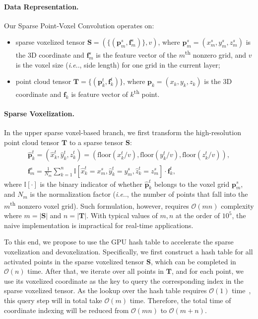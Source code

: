 \documentclass[runningheads]{llncs}
\makeatletter
\DeclareRobustCommand\onedot{\futurelet\@let@token\@onedot}
\def\@onedot{\ifx\@let@token.\else.\null\fi\xspace}
\def\ie{\emph{i.e}\onedot} \def\Ie{\emph{I.e}\onedot}
\def\module{Sparse Point-Voxel Convolution\xspace}
\makeatother
\begin{document}
\paragraph{Data Representation.}

Our \module operates on:
\begin{itemize}
     \item sparse voxelized tensor $\bm{S}= (\{(\bm{p}^s_m, \bm{f}^s_m)\}, v)$, where $\bm{p}^s_m = (x^s_m, y^s_m, z^s_m)$ is the 3D coordinate and $\bm{f}^s_m$ is the feature vector of the $m$\textsuperscript{th} nonzero grid, and $v$ is the voxel size (\ie, side length) for one grid in the current layer;
     \item point cloud tensor $\bm{T}= \{(\bm{p}^t_k, \bm{f}^t_k)\}$, where $\bm{p}_k = (x_k, y_k, z_k)$ is the 3D coordinate and $\bm{f}_k$ is feature vector of $k$\textsuperscript{th} point.
\end{itemize}

\paragraph{Sparse Voxelization.}

In the upper sparse voxel-based branch, we first transform the high-resolution point cloud tensor $\bm{T}$ to a sparse tensor $\bm{S}$:
\begin{align}
  \hat{\bm{p}}^t_k = (\hat{x}^t_k, \hat{y}^t_k, \hat{z}^t_k) = (\text{floor}(x^t_k / v), \text{floor}(y^t_k / v), \text{floor}(z^t_k / v)),\\
 \bm{f}^s_{m} = \frac{1}{N_m} \sum_{k=1}^n \mathbb{I}[\hat{x}^t_k = x^s_m,  \hat{y}^t_k = y^s_m, \hat{z}^t_k = z^s_m]\cdot \bm{f}^t_{k},
\label{eqn:sparsevoxelize}
\end{align}
where $\mathbb{I}[\cdot]$ is the binary indicator of whether $\hat{\bm{p}}^t_k$ belongs to the voxel grid $\bm{p}^s_m$, and $N_m$ is the normalization factor (\ie, the number of points that fall into the $m$\textsuperscript{th} nonzero voxel grid). Such formulation, however, requires $\mathcal{O}(mn)$ complexity where $m = |\bm{S}|$ and $n = |\bm{T}|$. With typical values of $m, n$ at the order of $10^5$, the naive implementation is impractical for real-time applications.

To this end, we propose to use the GPU hash table to accelerate the sparse voxelization and devoxelization. Specifically, we first construct a hash table for all activated points in the sparse voxelized tensor $\bm{S}$, which can be completed in $\mathcal{O}(n)$ time. After that, we iterate over all points in $\bm{T}$, and for each point, we use its voxelized coordinate as the key to query the corresponding index in the sparse voxelized tensor. As the lookup over the hash table requires $\mathcal{O}(1)$ time~\cite{pagh2001cuckoo}, this query step will in total take $\mathcal{O}(m)$ time. Therefore, the total time of coordinate indexing will be reduced from $\mathcal{O}(mn)$ to $\mathcal{O}(m+n)$. 
\end{document}
